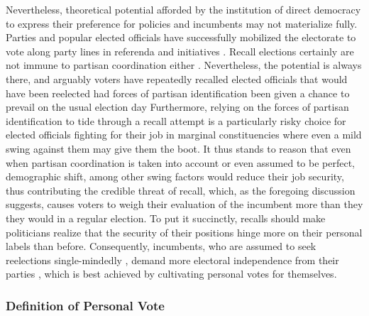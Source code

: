 \documentclass[hyphens, crop=false]{standalone}
\begin{document}
		Nevertheless,
		theoretical potential afforded by the institution of direct democracy to express their preference for policies and incumbents may not materialize fully.
		Parties and popular elected officials have successfully mobilized the electorate to vote along party lines in referenda and initiatives
		\autocite{bowlerDirectDemocracyUnited2010,brantonExaminingIndividualLevelVoting2003}.
		Recall elections certainly are not immune to partisan coordination either
		\autocite{masketCaliforniaRecallSprint2016}.
		Nevertheless,
		the potential is always there,
		and arguably voters have repeatedly recalled elected officials
		that would have been reelected had forces of partisan identification been given a chance to prevail on the usual election day
		\autocite{gerstonRecallCaliforniaPolitical2004}
		Furthermore,
		relying on the forces of partisan identification to tide through a recall attempt is a particularly risky choice
		for elected officials fighting for their job in marginal constituencies where even a mild swing against them may give them the boot.
		It thus stands to reason that even when partisan coordination is taken into account or even assumed to be perfect,
		demographic shift,
		among other swing factors would reduce their job security,
		thus contributing the credible threat of recall,
		which,
		as the foregoing discussion suggests,
		causes voters to weigh their evaluation of the incumbent more than they they would in a regular election.
		To put it succinctly, recalls should make politicians realize that the security of their positions hinge more on their personal labels than before.
		Consequently,
		incumbents,
		who are assumed to seek reelections single-mindedly
		\autocite{mayhewCongressElectoralConnection1974},
		demand more electoral independence from their parties
		\autocite{cainPersonalVoteConstituency1987},
		which is best achieved by cultivating personal votes for themselves.
		
		
		\subsubsection*{Definition of Personal Vote}
		
\end{document}
